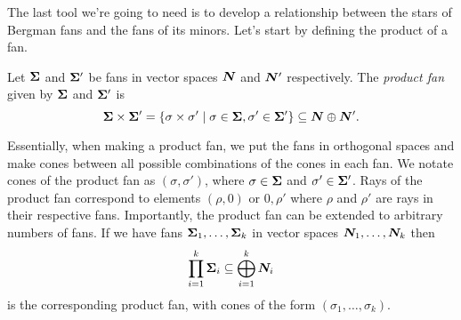 \documentclass[12pt,oneside]{../../sfsuthesis}
\begin{document}
The last tool we're going to need is to develop a relationship between the stars of Bergman fans and the fans of its minors.
Let's start by defining the product of a fan.
\begin{definition}\th\label{def:productFan}
    Let \( \bm{\Sigma} \) and \( \bm{\Sigma}' \) be fans in vector spaces \( \bm{N} \) and \( \bm{N}' \) respectively.
    The \emph{product fan} given by \( \bm{\Sigma} \) and \( \bm{\Sigma}' \) is
    \[
        \bm{\Sigma} \times \bm{\Sigma}' = \{ \sigma \times \sigma' \; | \; \sigma \in \bm{\Sigma}, \sigma' \in \bm{\Sigma}' \} \subseteq \bm{N} \oplus \bm{N}'.
    \]
\end{definition}
Essentially, when making a product fan, we put the fans in orthogonal spaces and make cones between all possible combinations of the cones in each fan.
We notate cones of the product fan as \( (\sigma, \sigma') \), where \( \sigma \in \bm{\Sigma} \) and \(\sigma' \in \bm{\Sigma}' \).
Rays of the product fan correspond to elements \( (\rho, 0) \) or \( 0, \rho' \) where \( \rho \) and \( \rho' \) are rays in their respective fans.
Importantly, the product fan can be extended to arbitrary numbers of fans.
If we have fans \( \bm{\Sigma}_1, \dots, \bm{\Sigma}_k \) in vector spaces \( \bm{N}_1, \dots, \bm{N}_k \) then
\[
    \prod_{i=1}^k \bm{\Sigma}_i \subseteq \bigoplus_{i=1}^k \bm{N}_i
\]
is the corresponding product fan, with cones of the form \( (\sigma_1, \dots, \sigma_k) \).
\end{document}
